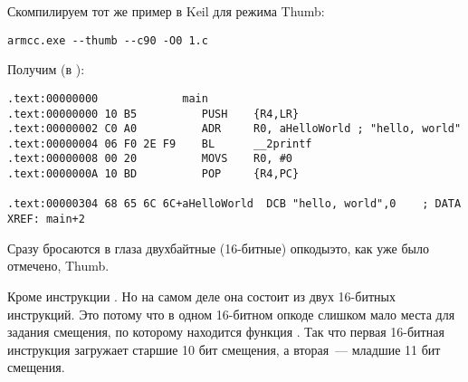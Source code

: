 \subsectionold{\NonOptimizingKeilVI (\ThumbMode)}

Скомпилируем тот же пример в Keil для режима Thumb:

\begin{lstlisting}
armcc.exe --thumb --c90 -O0 1.c 
\end{lstlisting}

Получим (в \IDA):

\begin{lstlisting}[caption=\NonOptimizingKeilVI (\ThumbMode) + \IDA]
.text:00000000             main
.text:00000000 10 B5          PUSH    {R4,LR}
.text:00000002 C0 A0          ADR     R0, aHelloWorld ; "hello, world"
.text:00000004 06 F0 2E F9    BL      __2printf
.text:00000008 00 20          MOVS    R0, #0
.text:0000000A 10 BD          POP     {R4,PC}

.text:00000304 68 65 6C 6C+aHelloWorld  DCB "hello, world",0    ; DATA XREF: main+2
\end{lstlisting}

Сразу бросаются в глаза двухбайтные (16-битные) опкоды\EMDASH{}это, как уже было отмечено, Thumb.

Кроме инструкции .
Но на самом деле она состоит из двух 16-битных инструкций.
Это потому что в одном 16-битном опкоде слишком мало места для задания смещения, по которому находится функция \printf.
Так что первая 16-битная инструкция загружает старшие 10 бит смещения, а вторая~--- младшие 11 бит смещения.


